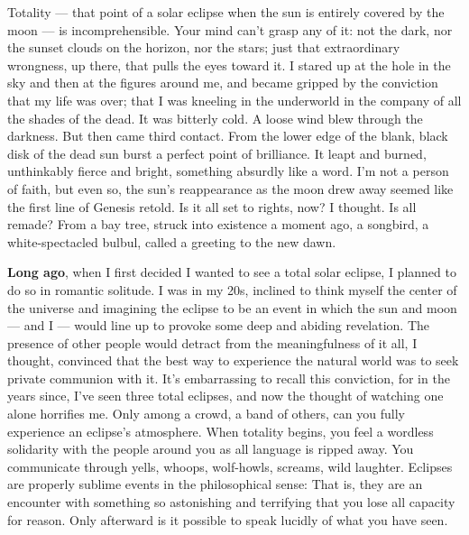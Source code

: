 Totality --- that point of a solar eclipse when the sun is entirely
covered by the moon --- is incomprehensible. Your mind can't grasp any
of it: not the dark, nor the sunset clouds on the horizon, nor the
stars; just that extraordinary wrongness, up there, that pulls the eyes
toward it. I stared up at the hole in the sky and then at the figures
around me, and became gripped by the conviction that my life was over;
that I was kneeling in the underworld in the company of all the shades
of the dead. It was bitterly cold. A loose wind blew through the
darkness. But then came third contact. From the lower edge of the blank,
black disk of the dead sun burst a perfect point of brilliance. It leapt
and burned, unthinkably fierce and bright, something absurdly like a
word. I'm not a person of faith, but even so, the sun's reappearance as
the moon drew away seemed like the first line of Genesis retold. Is it
all set to rights, now? I thought. Is all remade? From a bay tree,
struck into existence a moment ago, a songbird, a white-spectacled
bulbul, called a greeting to the new dawn.

\textbf{Long ago}, when I first decided I wanted to see a total solar
eclipse, I planned to do so in romantic solitude. I was in my 20s,
inclined to think myself the center of the universe and imagining the
eclipse to be an event in which the sun and moon --- and I --- would
line up to provoke some deep and abiding revelation. The presence of
other people would detract from the meaningfulness of it all, I thought,
convinced that the best way to experience the natural world was to seek
private communion with it. It's embarrassing to recall this conviction,
for in the years since, I've seen three total eclipses, and now the
thought of watching one alone horrifies me. Only among a crowd, a band
of others, can you fully experience an eclipse's atmosphere. When
totality begins, you feel a wordless solidarity with the people around
you as all language is ripped away. You communicate through yells,
whoops, wolf-howls, screams, wild laughter. Eclipses are properly
sublime events in the philosophical sense: That is, they are an
encounter with something so astonishing and terrifying that you lose all
capacity for reason. Only afterward is it possible to speak lucidly of
what you have seen.

